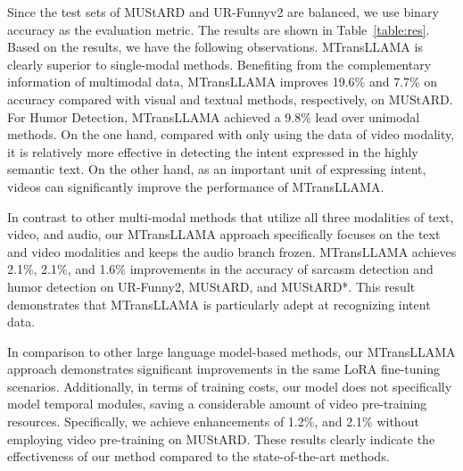Since the test sets of MUStARD and UR-Funnyv2 are balanced, we use binary accuracy as the evaluation metric. The results are shown in Table~\ref{table:res}. Based on the results, we have the following observations. MTransLLAMA is clearly superior to single-modal methods. Benefiting from the complementary information of multimodal data, MTransLLAMA improves 19.6\% and 7.7\% on accuracy compared with visual and textual methods, respectively, on MUStARD. For Humor Detection, MTransLLAMA achieved a 9.8\% lead over unimodal methods. On the one hand, compared with only using the data of video modality, it is relatively more effective in detecting the intent expressed in the highly semantic text. On the other hand, as an important unit of expressing intent, videos can significantly improve the performance of MTransLLAMA.

In contrast to other multi-modal methods that utilize all three modalities of text, video, and audio, our MTransLLAMA approach specifically focuses on the text and video modalities and keeps the audio branch frozen. MTransLLAMA achieves 2.1\%, 2.1\%, and 1.6\% improvements in the accuracy of sarcasm detection and humor detection on UR-Funny2, MUStARD, and MUStARD*. This result demonstrates that MTransLLAMA is particularly adept at recognizing intent data. 

In comparison to other large language model-based methods, our MTransLLAMA approach demonstrates significant improvements in the same LoRA fine-tuning scenarios. Additionally, in terms of training costs, our model does not specifically model temporal modules, saving a considerable amount of video pre-training resources. Specifically, we achieve enhancements of  1.2\%, and 2.1\% without employing video pre-training on MUStARD. These results clearly indicate the effectiveness of our method compared to the state-of-the-art methods.  


